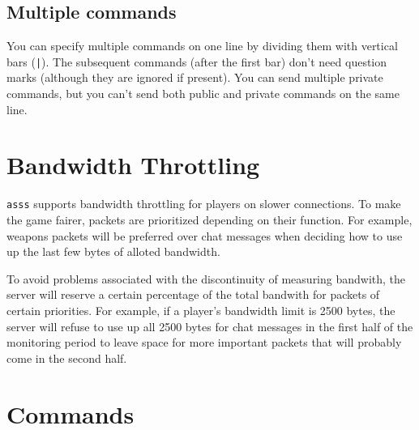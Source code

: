 \documentclass{article}
\newcommand{\asss}{\texttt{asss}}
\begin{document}
\subsection{Multiple commands}

You can specify multiple commands on one line by dividing them with
vertical bars (\verb/|/). The subsequent commands (after the first bar)
don't need question marks (although they are ignored if present). You
can send multiple private commands, but you can't send both public and
private commands on the same line.


\section{Bandwidth Throttling}

\asss{} supports bandwidth throttling for players on slower connections.
To make the game fairer, packets are prioritized depending on their
function. For example, weapons packets will be preferred over chat
messages when deciding how to use up the last few bytes of alloted
bandwidth.

To avoid problems associated with the discontinuity of measuring
bandwith, the server will reserve a certain percentage of the total
bandwith for packets of certain priorities. For example, if a player's
bandwidth limit is 2500 bytes, the server will refuse to use up all 2500
bytes for chat messages in the first half of the monitoring period to
leave space for more important packets that will probably come in the
second half.



%
%
%
%


\section{Commands}
\end{document}
